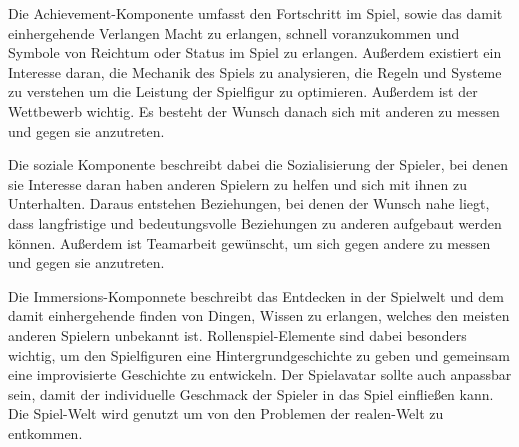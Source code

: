 Die Achievement-Komponente umfasst den Fortschritt im Spiel, sowie das damit einhergehende Verlangen Macht zu erlangen, schnell voranzukommen und Symbole von Reichtum oder Status im Spiel zu erlangen. Außerdem existiert ein Interesse daran, die Mechanik des Spiels zu analysieren, die Regeln und Systeme zu verstehen um die Leistung der Spielfigur zu optimieren. Außerdem ist der Wettbewerb wichtig. Es besteht der Wunsch danach sich mit anderen zu messen und gegen sie anzutreten.

Die soziale Komponente beschreibt dabei die Sozialisierung der Spieler, bei denen sie Interesse daran haben anderen Spielern zu helfen und sich mit ihnen zu Unterhalten. Daraus entstehen Beziehungen, bei denen der Wunsch nahe liegt, dass langfristige und bedeutungsvolle Beziehungen zu anderen aufgebaut werden können. Außerdem ist Teamarbeit gewünscht, um sich gegen andere zu messen und gegen sie anzutreten.

Die Immersions-Komponnete beschreibt das Entdecken in der Spielwelt und dem damit einhergehende finden von Dingen, Wissen zu erlangen, welches den meisten anderen Spielern unbekannt ist. Rollenspiel-Elemente sind dabei besonders wichtig, um den Spielfiguren eine Hintergrundgeschichte zu geben und gemeinsam eine improvisierte Geschichte zu entwickeln. Der Spielavatar sollte auch anpassbar sein, damit der individuelle Geschmack der Spieler in das Spiel einfließen kann. Die Spiel-Welt wird genutzt um von den Problemen der realen-Welt zu entkommen.





